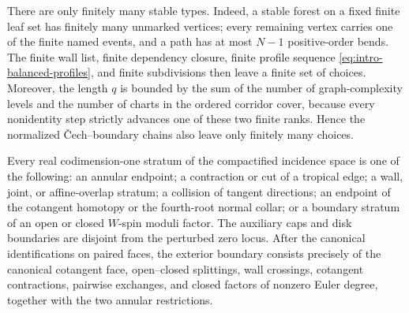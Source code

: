 There are only finitely many stable types.  Indeed, a stable forest on a
fixed finite leaf set has finitely many unmarked vertices; every remaining
vertex carries one of the finite named events, and a path has at most $N-1$
positive-order bends.  The finite wall list, finite dependency closure,
finite profile sequence \eqref{eq:intro-balanced-profiles}, and finite
subdivisions then leave a finite set of choices.  Moreover, the length $q$
is bounded by the sum of the number of graph-complexity levels and the number
of charts in the ordered corridor cover, because every nonidentity step
strictly advances one of these two finite ranks.  Hence the normalized
\v{C}ech--boundary chains also leave only finitely many choices.

\begin{proposition}
\label{prop:des-boundary-stratification}
Every real codimension-one stratum of the compactified incidence space is one
of the following: an annular endpoint; a contraction or cut of a tropical
edge; a wall, joint, or affine-overlap stratum; a collision of tangent
directions; an endpoint of the cotangent homotopy or the fourth-root normal
collar; or a boundary stratum of an open or closed $W$-spin moduli factor.
The auxiliary caps and disk boundaries are disjoint from the perturbed zero
locus.  After the canonical identifications on paired faces, the exterior
boundary consists precisely of the canonical cotangent face, open--closed
splittings, wall crossings, cotangent contractions, pairwise exchanges, and
closed factors of nonzero Euler degree, together with the two annular
restrictions.
\end{proposition}

